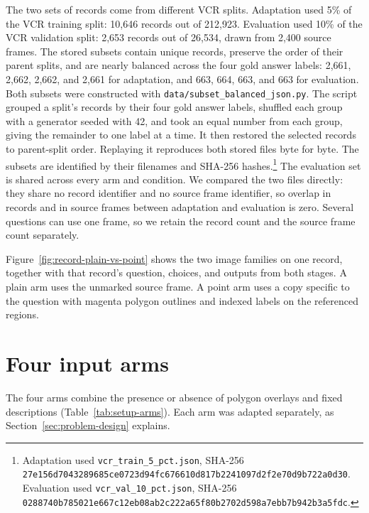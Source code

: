 The two sets of records come from different VCR splits. Adaptation used 5\% of the
VCR training split: 10,646 records out of 212,923. Evaluation used 10\% of the VCR
validation split: 2,653 records out of 26,534, drawn from 2,400 source frames. The
stored subsets contain unique records, preserve the order of their parent splits,
and are nearly balanced across the four gold answer labels: 2,661, 2,662, 2,662,
and 2,661 for adaptation, and 663, 664, 663, and 663 for evaluation. Both subsets
were constructed with \texttt{data/subset\_balanced\_json.py}. The script grouped a
split's records by their four gold answer labels, shuffled each group with a
generator seeded with 42, and took an equal number from each group, giving the
remainder to one label at a time. It then restored the selected records to
parent-split order. Replaying it reproduces both stored files byte for byte. The
subsets are identified by their filenames and SHA-256
hashes.\footnote{Adaptation used
\texttt{vcr\_train\_5\_pct.json}, SHA-256\\
\texttt{27e156d7043289685ce0723d94fc676610d817b2241097d2f2e70d9b722a0d30}.\\
Evaluation used \texttt{vcr\_val\_10\_pct.json}, SHA-256\\
\texttt{0288740b785021e667c12eb08ab2c222a65f80b2702d598a7ebb7b942b3a5fdc}.} The evaluation set is shared across every arm
and condition. We compared the two files directly: they share no record identifier
and no source frame identifier, so overlap in records and in source
frames between adaptation and evaluation is zero. Several questions can use one frame, so we retain the record count
and the source frame count separately.

Figure~\ref{fig:record-plain-vs-point} shows the two image families on one
record, together with that record's question, choices, and outputs from both
stages. A plain arm uses the unmarked source frame. A point arm uses a copy
specific to the question with magenta polygon outlines and indexed labels on the
referenced regions.



\section{Four input arms}
\label{sec:setup-arms}

The four arms combine the presence or absence of polygon overlays and fixed
descriptions (Table~\ref{tab:setup-arms}). Each arm was adapted separately, as
Section~\ref{sec:problem-design} explains.

